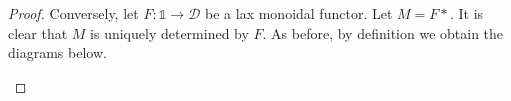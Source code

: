 \documentclass[ 12pt ]{article}
\begin{document}
\begin{enumerate}
\begin{proof}
			Conversely, let $F : \mathbb{1} \to \mathscr{D}$ be a lax monoidal functor. Let $M = F \ast$. It is clear that $M$ is uniquely determined by $F$. As before, by definition we obtain the diagrams below.
			\begin{center}
\end{center}
\end{proof}
\end{enumerate}
\end{document}
